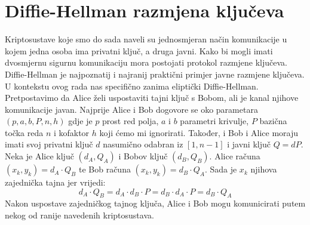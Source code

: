 \documentclass{mathos}
\begin{document}
\section{Diffie-Hellman razmjena ključeva}
Kriptosustave koje smo do sada naveli su jednosmjeran način komunikacije u kojem jedna osoba ima privatni ključ, a druga javni. Kako bi mogli imati dvosmjernu sigurnu komunikaciju mora postojati protokol razmjene ključeva. Diffie-Hellman je najpoznatij i najranij praktični primjer javne razmjene ključeva. U kontekstu ovog rada nas specifično zanima eliptički Diffie-Hellman. Pretpostavimo da Alice želi uspostaviti tajni ključ s Bobom, ali je kanal njihove komunikacije javan. Najprije Alice i Bob dogovore se oko parametara $(p, a, b, P, n, h)$ gdje je $p$ prost red polja, $a$ i $b$ parametri krivulje, $P$ bazična točka reda $n$ i kofaktor $h$ koji ćemo mi ignorirati. Također, i Bob i Alice moraju imati svoj privatni ključ $d$ nasumično odabran iz $[1, n-1]$ i javni ključ $Q = dP$. Neka je Alice ključ $(d_A, Q_A)$ i Bobov ključ $(d_B, Q_B)$. Alice računa $(x_k, y_k) = d_A \cdot Q_B$ te Bob računa $(x_k, y_k) = d_B \cdot Q_A$. Sada je $x_k$ njihova zajednička tajna jer vrijedi: \[ d_A \cdot Q_B = d_A \cdot d_B \cdot P =  d_B \cdot d_A \cdot P = d_B \cdot Q_A \] Nakon uspostave zajedničkog tajnog ključa, Alice i Bob mogu komunicirati putem nekog od ranije navedenih kriptosustava.
\end{document}
